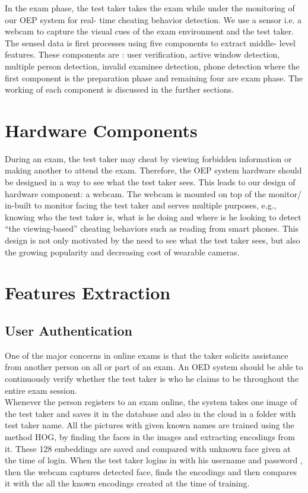 \documentclass[12pt]{report}
\begin{document}
		In the exam phase, the test taker takes the exam while under the monitoring of our OEP system for real- time cheating behavior detection. We use a sensor i.e. a webcam to capture the visual cues of the exam environment and the test taker. The sensed data is first processes using five components to extract middle- level features. These components are : user verification, active window detection, multiple person detection, invalid examinee detection, phone detection where the first component is the preparation phase and remaining four are exam phase. The working of each component is discussed in the further sections.
\section{Hardware Components}

During an exam, the test taker may cheat by viewing forbidden information or making another to attend the exam. Therefore, the OEP system hardware should be designed in a way to see what the test taker sees. This leads to our design of hardware component: a webcam. The webcam is mounted on top of the monitor/ in-built to monitor facing the test taker and serves multiple purposes, e.g., knowing who the test taker is, what is he doing and where is he looking to detect “the viewing-based” cheating behaviors such as reading from smart phones. This design is not only motivated by the need to see what the test taker sees, but also the growing popularity and decreasing cost of wearable cameras. 
 \section{Features Extraction}
\subsection{User Authentication}

One of the major concerns in online exams is that the taker solicits assistance from another person on all or part of an exam. An OED system should be able to continuously verify whether the test taker is who he claims to be throughout the entire exam session. \\

		Whenever the person registers to an exam online, the system takes one image of the test taker and saves it in the database and also in the cloud in a folder with test taker name. All the pictures with given known names are trained using the method HOG, by finding the faces in the images and extracting encodings from it. These 128 embeddings are saved and compared with unknown face given at the time of login. When the test taker logins in with his username and password , then the webcam captures detected face, finds the encodings and then compares it with the all the known encodings created at the time of training. \\
\end{document}
